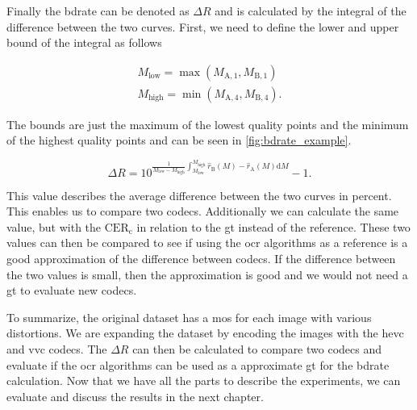 Finally the \gls{bdrate} can be denoted as $\Delta R$ and is calculated by the integral of the difference between the two curves.
First, we need to define the lower and upper bound of the integral as follows

\begin{equation}
    \begin{aligned}
        M_{\text{low}} = \max\left(M_{\text{A},1}, M_{\text{B},1}\right) \\
        M_{\text{high}} = \min\left(M_{\text{A},4}, M_{\text{B},4}\right).
    \end{aligned}
    \label{eq:bounds}
\end{equation}

The bounds are just the maximum of the lowest quality points and the minimum of the highest quality points and can be seen in \autoref{fig:bdrate_example}.

\begin{equation}
    \Delta R = 10^{\frac{1}{M_{\text{low}}-M_{\text{high}}} \int_{M_{\text{low}}}^{M_{\text{high}}} \hat{r}_{\text{B}}(M) - \hat{r}_{\text{A}}(M) \text{d}M} - 1.
    \label{eq:bdrate}
\end{equation}

This value describes the average difference between the two curves in percent.
This enables us to compare two codecs.
Additionally we can calculate the same value, but with the $\text{CER}_{\text{c}}$ in relation to the \gls{gt} instead of the reference.
These two values can then be compared to see if using the \gls{ocr} algorithms as a reference is a good approximation of the difference between codecs.
If the difference between the two values is small, then the approximation is good and we would not need a \gls{gt} to evaluate new codecs.

To summarize, the original dataset has a \gls{mos} for each image with various distortions.
We are expanding the dataset by encoding the images with the \gls{hevc} and \gls{vvc} codecs.
The $\Delta R$ can then be calculated to compare two codecs and evaluate if the \gls{ocr} algorithms can be used as a approximate \gls{gt} for the \gls{bdrate} calculation.
Now that we have all the parts to describe the experiments, we can evaluate and discuss the results in the next chapter.

